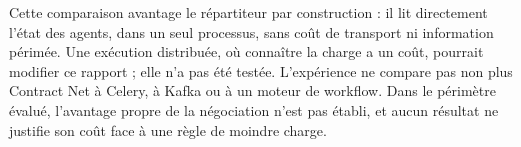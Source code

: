 Cette comparaison avantage le répartiteur par construction : il lit directement l'état des agents, dans un seul processus, sans coût de transport ni information périmée. Une exécution distribuée, où connaître la charge a un coût, pourrait modifier ce rapport ; elle n'a pas été testée. L'expérience ne compare pas non plus Contract Net à Celery, à Kafka ou à un moteur de workflow. Dans le périmètre évalué, l'avantage propre de la négociation n'est pas établi, et aucun résultat ne justifie son coût face à une règle de moindre charge.

